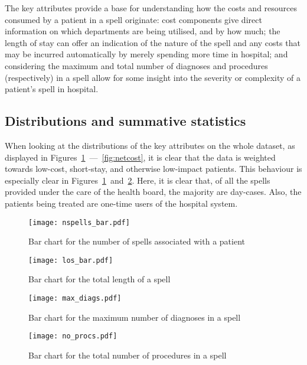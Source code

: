 The key attributes provide a base for understanding how the costs and resources
consumed by a patient in a spell originate: cost components give direct
information on which departments are being utilised, and by how much; the length
of stay can offer an indication of the nature of the spell and any costs that
may be incurred automatically by merely spending more time in hospital; and
considering the maximum and total number of diagnoses and procedures
(respectively) in a spell allow for some insight into the severity or complexity
of a patient's spell in hospital.

\subsection{Distributions and summative statistics}%
\label{subsec:distributions_statistics}
\graphicspath{{chapters/data/paper/img/overview/}}

When looking at the distributions of the key attributes on the whole dataset, as
displayed in Figures~\ref{fig:no_spells}~---~\ref{fig:netcost}, it is clear
that the data is weighted towards low-cost, short-stay, and otherwise low-impact
patients. This behaviour is especially clear in
Figures~\ref{fig:no_spells}~and~\ref{fig:los}. Here, it is clear that, of all
the spells provided under the care of the health board, the majority are
day-cases. Also, the patients being treated are one-time users of the hospital
system.

\begin{figure}[htbp]
    \centering
    \texttt{[image: nspells\_bar.pdf]}
    \caption{Bar chart for the number of spells associated with a patient}%
    \label{fig:no_spells}
\end{figure}

\begin{figure}[htbp]
    \centering
    \texttt{[image: los\_bar.pdf]}
    \caption{Bar chart for the total length of a spell}%
    \label{fig:los}
\end{figure}

\begin{figure}[htbp]
    \centering
    \texttt{[image: max\_diags.pdf]}
    \caption{Bar chart for the maximum number of diagnoses in a spell}%
    \label{fig:no_diag}
\end{figure}

\begin{figure}[htbp]
    \centering
    \texttt{[image: no\_procs.pdf]}
    \caption{Bar chart for the total number of procedures in a spell}%
    \label{fig:no_proc}
\end{figure}

